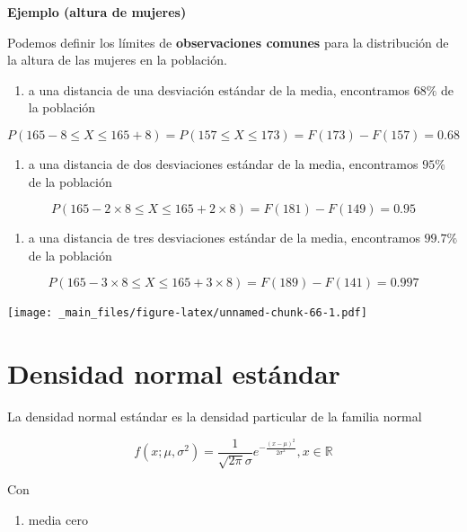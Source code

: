 \documentclass[
]{book}
\providecommand{\tightlist}{%
  \setlength{\itemsep}{0pt}\setlength{\parskip}{0pt}}
\begin{document}
\textbf{Ejemplo (altura de mujeres)}

Podemos definir los límites de \textbf{observaciones comunes} para la distribución de la altura de las mujeres en la población.

\begin{enumerate}
\def\labelenumi{\arabic{enumi})}
\tightlist
\item
  a una distancia de una desviación estándar de la media, encontramos \(68\%\) de la población
\end{enumerate}

\[P(165-8 \leq X \leq 165+8)=P(157 \leq X \leq 173)=F(173)-F(157)=0.68\]

\begin{enumerate}
\def\labelenumi{\arabic{enumi})}
\setcounter{enumi}{1}
\tightlist
\item
  a una distancia de dos desviaciones estándar de la media, encontramos \(95\%\) de la población
\end{enumerate}

\[P(165-2 \times 8 \leq X \leq 165+2\times 8)=F(181)-F(149)=0.95\]

\begin{enumerate}
\def\labelenumi{\arabic{enumi})}
\setcounter{enumi}{2}
\tightlist
\item
  a una distancia de tres desviaciones estándar de la media, encontramos \(99.7\%\) de la población
\end{enumerate}

\[P(165-3 \times 8 \leq X \leq 165+3\times 8)=F(189)-F(141)=0.997\]

\texttt{[image: \_main\_files/figure-latex/unnamed-chunk-66-1.pdf]}

\hypertarget{densidad-normal-estuxe1ndar}{%
\section{Densidad normal estándar}\label{densidad-normal-estuxe1ndar}}

La densidad normal estándar es la densidad particular de la familia normal

\[f(x; \mu, \sigma^2)=\frac{1}{\sqrt{2\pi}\sigma}e^{-\frac{(x-\mu)^2}{2\sigma^2}}, x \in {\mathbb R}\]

Con

\begin{enumerate}
\def\labelenumi{\arabic{enumi})}
\tightlist
\item
  media cero
\end{enumerate}
\end{document}
